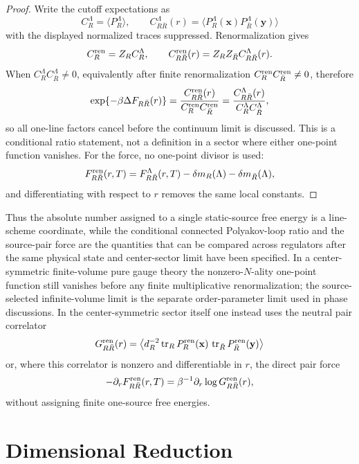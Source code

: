 \begin{proof}
Write the cutoff expectations as
\[
  C_R^\Lambda=\langle P_R^\Lambda\rangle,\qquad
  C_{R\bar R}^\Lambda(r)=
  \langle P_R^\Lambda(\mathbf x)P_{\bar R}^\Lambda(\mathbf y)\rangle
\]
with the displayed normalized traces suppressed.  Renormalization gives
\[
  C_R^{\rm ren}=Z_R C_R^\Lambda,\qquad
  C_{R\bar R}^{\rm ren}(r)=Z_RZ_{\bar R}C_{R\bar R}^\Lambda(r).
\]
When \(C_R^\Lambda C_{\bar R}^\Lambda\ne0\), equivalently after finite
renormalization \(C_R^{\rm ren}C_{\bar R}^{\rm ren}\ne0\), therefore
\[
  \exp\{-\beta\Delta F_{R\bar R}(r)\}
  =
  \frac{C_{R\bar R}^{\rm ren}(r)}
       {C_R^{\rm ren}C_{\bar R}^{\rm ren}}
  =
  \frac{C_{R\bar R}^{\Lambda}(r)}
       {C_R^\Lambda C_{\bar R}^\Lambda},
\]
so all one-line factors cancel before the continuum limit is discussed.  This
is a conditional ratio statement, not a definition in a sector where either
one-point function vanishes.  For the force, no one-point divisor is used:
\[
  F_{R\bar R}^{\rm ren}(r,T)
  =
  F_{R\bar R}^{\Lambda}(r,T)
  -\delta m_R(\Lambda)-\delta m_{\bar R}(\Lambda),
\]
and differentiating with respect to \(r\) removes the same local constants.
\end{proof}

Thus the absolute number assigned to a single static-source free energy is a
line-scheme coordinate, while the conditional connected Polyakov-loop ratio
and the source-pair force are the quantities that can be compared across
regulators after the same physical state and center-sector limit have been
specified.  In a center-symmetric finite-volume pure gauge theory the
nonzero-\(N\)-ality one-point function still vanishes before any finite
multiplicative renormalization; the source-selected infinite-volume limit is
the separate order-parameter limit used in phase discussions.  In the
center-symmetric sector itself one instead uses the neutral pair correlator
\[
  G_{R\bar R}^{\rm ren}(r)
  =
  \left\langle d_R^{-2}
  \operatorname{tr}_R P_R^{\rm ren}(\mathbf x)\,
  \operatorname{tr}_{\bar R}P_{\bar R}^{\rm ren}(\mathbf y)
  \right\rangle
\]
or, where this correlator is nonzero and differentiable in \(r\), the direct
pair force
\[
  -\partial_rF_{R\bar R}^{\rm ren}(r,T)
  =
  \beta^{-1}\partial_r\log G_{R\bar R}^{\rm ren}(r),
\]
without assigning finite one-source free energies.

\section{Dimensional Reduction}

